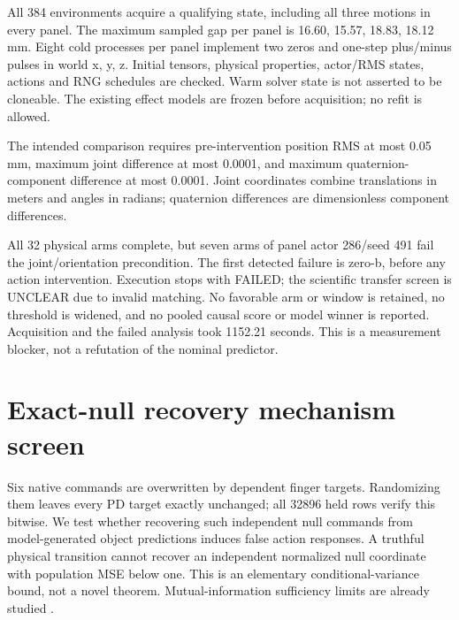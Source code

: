 \documentclass[10pt]{article}
\begin{document}
All 384 environments acquire a qualifying state, including all three motions in
every panel. The maximum sampled gap per panel is 16.60, 15.57, 18.83, 18.12 mm.
Eight cold processes per panel implement two zeros and one-step plus/minus pulses
in world x, y, z. Initial tensors, physical properties, actor/RMS states, actions and
RNG schedules are checked. Warm solver state is not asserted to be cloneable.
The existing effect models are frozen before acquisition; no refit is allowed.

The intended comparison requires pre-intervention position RMS at most 0.05 mm,
maximum joint difference at most 0.0001, and maximum quaternion-component difference
at most 0.0001. Joint coordinates combine translations in meters and angles in
radians; quaternion differences are dimensionless component differences.

\begin{table}[h]
\centering

\caption{Maximum pre-intervention mismatch over arms relative to zero-a. Limits: position 0.05 mm; joint and quaternion components 0.0001.}
\end{table}

All 32 physical arms complete, but seven arms of panel actor 286/seed 491 fail the
joint/orientation precondition. The first detected failure is zero-b, before any
action intervention. Execution stops with FAILED; the scientific transfer screen
is UNCLEAR due to invalid matching. No favorable arm or window is retained, no
threshold is widened, and no pooled causal score or model winner is reported.
Acquisition and the failed analysis took 1152.21 seconds. This is a measurement
blocker, not a refutation of the nominal predictor.

\section{Exact-null recovery mechanism screen}
Six native commands are overwritten by dependent finger targets. Randomizing them
leaves every PD target exactly unchanged; all 32896 held rows verify this bitwise.
We test whether recovering such independent null commands from model-generated
object predictions induces false action responses. A truthful physical transition
cannot recover an independent normalized null coordinate with population MSE below
one. This is an elementary conditional-variance bound, not a novel theorem.
Mutual-information sufficiency limits are already studied \cite{rakelly2021}.
\end{document}
